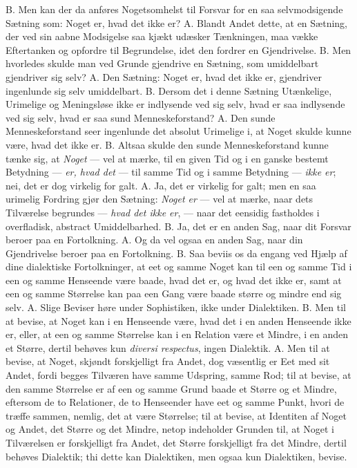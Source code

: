 \documentclass[12pt,a4paper]{book}
\begin{document}
B. Men kan der da anføres Nogetsomhelst til Forsvar for en saa
selvmodsigende Sætning som: Noget er, hvad det ikke er? A. Blandt
Andet dette, at en Sætning, der ved sin aabne Modsigelse saa kjækt
udæsker Tænkningen, maa vække Eftertanken og opfordre til Begrundelse,
idet den fordrer en Gjendrivelse. B. Men hvorledes skulde man ved
Grunde gjendrive en Sætning, som umiddelbart gjendriver sig selv?
A. Den Sætning: Noget er, hvad det ikke er, gjendriver ingenlunde sig
selv umiddelbart. B. Dersom det i denne Sætning Utænkelige, Urimelige
og Meningsløse ikke er indlysende ved sig selv, hvad er saa indlysende
ved sig selv, hvad er saa sund Menneskeforstand? A. Den sunde
Menneskeforstand seer ingenlunde det absolut Urimelige i, at Noget
skulde kunne være, hvad det ikke er. B. Altsaa skulde den sunde
Menneskeforstand kunne tænke sig, at \emph{Noget} --- vel at mærke, til
en given Tid og i en ganske bestemt Betydning --- \emph{er, hvad det}
--- til samme Tid og i samme Betydning --- \emph{ikke er}; nei, det er
dog virkelig for galt. A. Ja, det er virkelig for galt; men en saa
urimelig Fordring gjør den Sætning: \emph{Noget er} --- vel at mærke,
naar dets Tilværelse begrundes --- \emph{hvad det ikke er}, --- naar det
eensidig fastholdes i overfladisk, abstract Umiddelbarhed. B. Ja, det
er en anden Sag, naar dit Forsvar beroer paa en Fortolkning.
A. Og da vel ogsaa en anden Sag, naar din Gjendrivelse beroer paa en
Fortolkning. B. Saa beviis os da engang ved Hjælp af dine dialektiske
Fortolkninger, at eet og samme Noget kan til een og samme Tid i een og
samme Henseende være baade, hvad det er, og hvad det ikke er, samt at
een og samme Størrelse kan paa een Gang være baade større og mindre end
sig selv. A. Slige Beviser høre under Sophistiken, ikke under
Dialektiken. B. Men til at bevise, at Noget kan i en Henseende være,
hvad det i en anden Henseende ikke er, eller, at een og samme Størrelse
kan i en Relation være et Mindre, i en anden et Større, dertil behøves
kun \textit{diversi respectus}, ingen Dialektik. A. Men til at bevise,
at Noget, skjøndt forskjelligt fra Andet, dog væsentlig er Eet med sit
Andet, fordi begges Tilværen have samme Udspring, samme Rod; til at
bevise, at den samme Størrelse er af een og samme Grund baade et Større
og et Mindre, eftersom de to Relationer, de to Henseender have eet og
samme Punkt, hvori de træffe sammen, nemlig, det at være Størrelse; til
at bevise, at Identiten
af Noget og Andet, det Større og det Mindre, netop indeholder Grunden
til, at Noget i Tilværelsen er forskjelligt fra Andet, det Større
forskjelligt fra det Mindre, dertil behøves Dialektik; thi dette kan
Dialektiken, men ogsaa kun Dialektiken, bevise.
\end{document}
